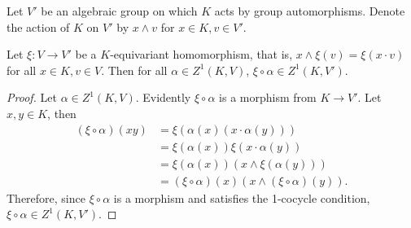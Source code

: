 \begin{lemma} \label{xi}
	Let $V'$ be an algebraic group on which $K$ acts by group automorphisms. Denote the action of $K$ on $V'$ by $x \wedge v$ for $x \in K, v \in V'$.

	Let $\xi: V \rightarrow V'$ be a $K$-equivariant homomorphism, that is, $x \wedge \xi(v) = \xi(x \cdot v)$ for all $x \in K, v \in V$. Then for all $\alpha \in Z^1(K, V)$, $\xi \circ \alpha \in Z^1(K, V')$. 
\end{lemma}
\begin{proof}
	Let $\alpha \in Z^1(K, V)$. Evidently $\xi \circ \alpha$ is a morphism from $K \rightarrow V'$. Let $x, y \in K$, then
	\begin{align*}
		(\xi \circ \alpha)(xy) &= \xi\left(\alpha(x)(x \cdot \alpha(y))\right) \\
			&= \xi(\alpha(x))\xi(x \cdot \alpha(y)) \\
			&= \xi(\alpha(x))\left(x \wedge \xi(\alpha(y))\right) \\
			&= (\xi \circ \alpha)(x)\left(x \wedge (\xi \circ \alpha)(y)\right).
	\end{align*}
	Therefore, since $\xi \circ \alpha$ is a morphism and satisfies the 1-cocycle condition, $\xi \circ \alpha \in Z^1(K, V')$.
\end{proof}

